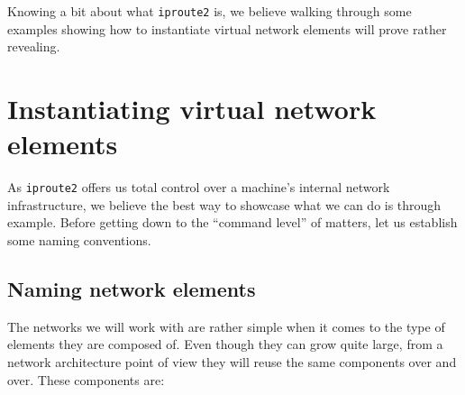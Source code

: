         Knowing a bit about what \texttt{iproute2} is, we believe walking through some examples showing how to instantiate virtual network elements will prove rather revealing.\\

    \section{Instantiating virtual network elements}
        As \texttt{iproute2} offers us total control over a machine's internal network infrastructure, we believe the best way to showcase what we can do is through example. Before getting down to the ``command level'' of matters, let us establish some naming conventions.\\

        \subsection{Naming network elements}
            The networks we will work with are rather simple when it comes to the type of elements they are composed of. Even though they can grow quite large, from a network architecture point of view they will reuse the same components over and over. These components are:\\

